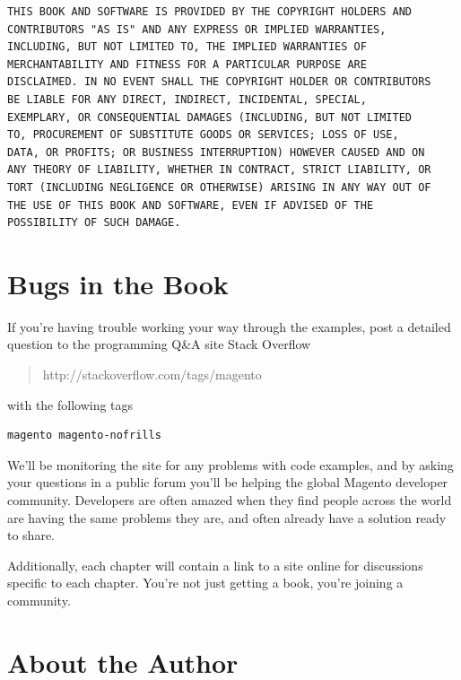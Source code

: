 \documentclass[oneside]{book}
\begin{document}
\begin{lstlisting}
THIS BOOK AND SOFTWARE IS PROVIDED BY THE COPYRIGHT HOLDERS AND
CONTRIBUTORS "AS IS" AND ANY EXPRESS OR IMPLIED WARRANTIES,
INCLUDING, BUT NOT LIMITED TO, THE IMPLIED WARRANTIES OF
MERCHANTABILITY AND FITNESS FOR A PARTICULAR PURPOSE ARE
DISCLAIMED. IN NO EVENT SHALL THE COPYRIGHT HOLDER OR CONTRIBUTORS
BE LIABLE FOR ANY DIRECT, INDIRECT, INCIDENTAL, SPECIAL,
EXEMPLARY, OR CONSEQUENTIAL DAMAGES (INCLUDING, BUT NOT LIMITED
TO, PROCUREMENT OF SUBSTITUTE GOODS OR SERVICES; LOSS OF USE,
DATA, OR PROFITS; OR BUSINESS INTERRUPTION) HOWEVER CAUSED AND ON
ANY THEORY OF LIABILITY, WHETHER IN CONTRACT, STRICT LIABILITY, OR
TORT (INCLUDING NEGLIGENCE OR OTHERWISE) ARISING IN ANY WAY OUT OF
THE USE OF THIS BOOK AND SOFTWARE, EVEN IF ADVISED OF THE
POSSIBILITY OF SUCH DAMAGE.

\end{lstlisting}


\section{Bugs in the Book}

If you're having trouble working your way through the examples, post a detailed question to the programming Q\&A site Stack Overflow 

\begin{quote}
http://stackoverflow.com/tags/magento
\end{quote}

with the following tags

\begin{lstlisting}
magento magento-nofrills

\end{lstlisting}


We'll be monitoring the site for any problems with code examples, and by asking your questions in a public forum you'll be helping the global Magento developer community.  Developers are often amazed when they find people across the world are having the same problems they are, and often already have a solution ready to share. 

Additionally, each chapter will contain a link to a site online for discussions specific to each chapter.  You're not just getting a book, you're joining a community.

\section{About the Author}
\end{document}
